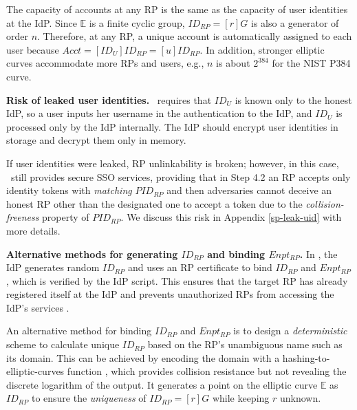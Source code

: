The capacity of accounts at any RP is the same as the capacity of user identities at the IdP.
Since $\mathbb{E}$ is a finite cyclic group, $ID_{RP} = [r]G$ is also a generator of order $n$.
Therefore, at any RP, a unique account is automatically assigned to each user because $Acct =  [ID_U]ID_{RP} = [u]ID_{RP}$.
In addition, stronger elliptic curves accommodate more RPs and users, e.g., $n$ is about $2^{384}$ for the NIST P384 curve.


\noindent \textbf{Risk of leaked user identities.}
\usso\ requires that $ID_U$ is known only to the honest IdP,
so a user inputs her username in the authentication to the IdP,
     and $ID_U$ is processed only by the IdP internally.
The IdP should encrypt user identities in storage and decrypt them only in memory.

If user identities were leaked, RP unlinkability is broken;
 however, in this case, \usso\ still provides secure SSO services, providing that in Step 4.2 an RP accepts only identity tokens with \emph{matching} $PID_{RP}$
    and then adversaries cannot deceive an honest RP other than the designated one to accept a token due to the \emph{collision-freeness} property of $PID_{RP}$.
We discuss this risk in Appendix \ref{sp-leak-uid} with more details.


\noindent \textbf{Alternative methods for generating $ID_{RP}$ and binding $Enpt_{RP}$.}
In \usso, the IdP generates random $ID_{RP}$ and uses an RP certificate to bind $ID_{RP}$ and $Enpt_{RP}$, which is verified by the IdP script. This ensures that the target RP has already registered itself at the IdP and prevents unauthorized RPs from accessing the IdP's services \cite{save-flow}.

An alternative method for binding $ID_{RP}$ and $Enpt_{RP}$ is
 to design a \emph{deterministic} scheme to calculate unique $ID_{RP}$ based on the RP's unambiguous name such as its domain.
This can be achieved by encoding the domain with a hashing-to-elliptic-curves function \cite{irtf-cfrg-hash-to-curve-16}, which provides collision resistance but not revealing the discrete logarithm of the output. It generates a point on the elliptic curve $\mathbb{E}$ as $ID_{RP}$ to ensure the \emph{uniqueness} of $ID_{RP} = [r]G$ while keeping $r$ unknown. %

